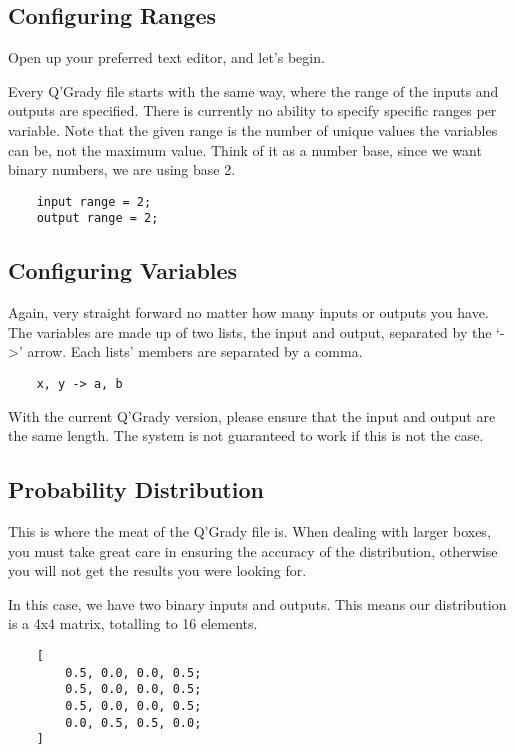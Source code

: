 \documentclass[report.tex]{subfiles}
\begin{document}
\subsection{Configuring Ranges} %
\label{sub:configuring_ranges}
Open up your preferred text editor, and let's begin. 

Every Q'Grady file starts with the same way, where the range of the inputs
and outputs are specified. There is currently no ability to specify specific
ranges per variable. Note that the given range is the number of unique values
the variables can be, not the maximum value. Think of it as a number base, since
we want binary numbers, we are using base 2.

\begin{lstlisting}
    input range = 2;
    output range = 2;
\end{lstlisting}

\subsection{Configuring Variables} %
\label{sub:configuring_variables}
Again, very straight forward no matter how many inputs or outputs you have.
The variables are made up of two lists, the input and output, separated by the
`->' arrow. Each lists' members are separated by a comma.

\begin{lstlisting}
    x, y -> a, b
\end{lstlisting}

With the current Q'Grady version, please ensure that the input and output are
the same length. The system is not guaranteed to work if this is not the case.

\subsection{Probability Distribution} %
\label{sub:probability_distribution}
This is where the meat of the Q'Grady file is. When dealing with larger boxes,
you must take great care in ensuring the accuracy of the distribution, otherwise
you will not get the results you were looking for.

In this case, we have two binary inputs and outputs. This means our distribution
is a 4x4 matrix, totalling to 16 elements.

\begin{lstlisting}
    [
        0.5, 0.0, 0.0, 0.5;
        0.5, 0.0, 0.0, 0.5;
        0.5, 0.0, 0.0, 0.5;
        0.0, 0.5, 0.5, 0.0;
    ]    
\end{lstlisting}
\end{document}
